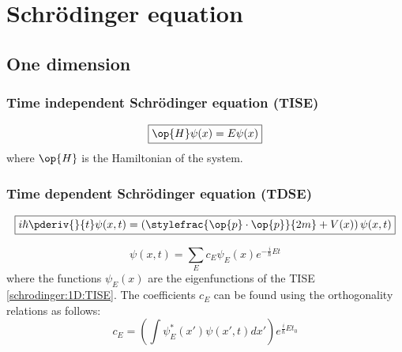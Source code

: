 \chapter{Schr\"odinger equation}

\section{One dimension}

\subsection{Time independent Schr\"odinger equation (TISE)}
    \begin{formula}[TISE]
		\begin{equation}
			\label{schrodinger:1D:TISE}
            \boxed{\op{H}\psi(x) = E\psi(x)}
		\end{equation}
        where $\op{H}$ is the Hamiltonian of the system.
	\end{formula}
    

\subsection{Time dependent Schr\"odinger equation (TDSE)}

	\begin{formula}
		\begin{equation}
			\label{schrodinger:1D:TDSE_position}
            \boxed{i\hbar\pderiv{}{t}\psi(x, t) = \left(\stylefrac{\op{p}\cdot\op{p}}{2m} + V(x)\right)\psi(x, t)}
		\end{equation}
	\end{formula}
    \begin{formula}
		\begin{equation}
			\label{schrodinger:1D:general_solution}
            \boxed{\psi(x, t) = \sum_Ec_E\psi_E(x)e^{-\frac{i}{\hbar}Et}}
		\end{equation}
        where the functions $\psi_E(x)$ are the eigenfunctions of the TISE \ref{schrodinger:1D:TISE}. The coefficients $c_E$ can be found using the orthogonality relations as follows:
        \begin{equation}
			\label{schrodinger:1D:general_solution_coefficients}
            c_E=\left(\int\psi_E^*(x')\psi(x', t)dx'\right)e^{\frac{i}{\hbar}Et_0}
		\end{equation}
	\end{formula}